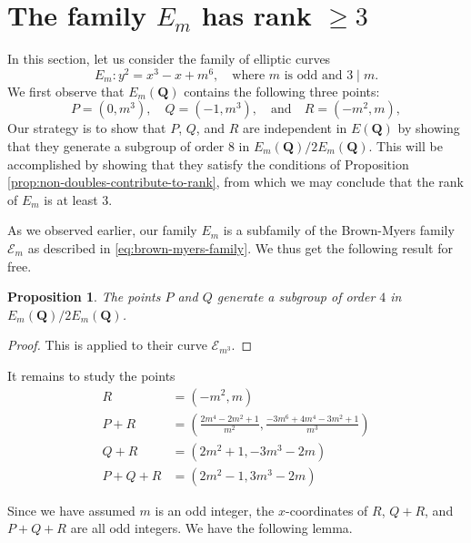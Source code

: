 \documentclass{amsart}
\newtheorem{proposition}[theorem]{Proposition}
\numberwithin{equation}{section}
\theoremstyle{remark}
\newcommand{\Q}{\mathbf{Q}}
\begin{document}
\section{The family $E_m$ has rank $\geq 3$}\label{sec:family1}

In this section, let us consider the family of elliptic curves
\[
E_m \colon y^2 = x^3-x+m^6, \quad \text{where $m$ is odd and $3 \mid m$}.
\]
We first observe that $E_m(\Q)$ contains the following three points:
\[
P=(0,m^3), \quad  Q=(-1,m^3), \quad \text{and} \quad  R=(-m^2,m),
\]
Our strategy is to show that $P$, $Q$, and $R$
are independent in $E(\Q)$ by showing that they generate a subgroup of order $8$ in $E_m(\Q)/2E_m(\Q)$. This will be accomplished by showing that they satisfy the conditions of Proposition \ref{prop:non-doubles-contribute-to-rank}, from which we may conclude that the rank of $E_m$ is at least 3.

As we observed earlier, our family $E_m$ is a subfamily of the Brown-Myers family $\mathcal{E}_m$ as described in \eqref{eq:brown-myers-family}. We thus get the following result for free.

\begin{proposition}\label{prop:family1-prop1}
The points $P$ and $Q$ generate a subgroup of order $4$ in $E_m(\Q)/2E_m(\Q)$.
\end{proposition}
\begin{proof}
This is \cite[Lemma 6]{BrownMyers} applied to their curve $\mathcal{E}_{m^3}$.
\end{proof}

It remains to study the points
\begin{align*}
R&=(-m^2,m)\\
P+R&=\left(\frac{2m^4-2m^2+1}{m^2},\frac{-3m^6+4m^4-3m^2+1}{m^3}\right)\\
Q+R&=(2m^2+1,-3m^3-2m)\\
P+Q+R&=(2m^2-1,3m^3-2m)
\end{align*}

Since we have assumed $m$ is an odd integer, the $x$-coordinates of $R$, $Q+R$, and $P+Q+R$ are all odd integers. We have the following lemma.
\end{document}
